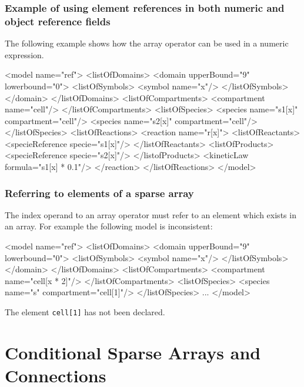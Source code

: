 \documentclass{cekarticle}
\begin{document}
\subsubsection{Example of using element references in both numeric and object reference fields}
The following example shows how the array operator can be used in
a numeric expression.

\begin{example}
<model name="ref">
    <listOfDomains>
        <domain upperBound="9" lowerbound="0">
            <listOfSymbols>
                <symbol name="x"/>
            </listOfSymbols>
        </domain>
    </listOfDomains>
    <listOfCompartments>
        <compartment name="cell"/>
    </listOfCompartments>
    <listOfSpecies>
        <species name="s1[x]" compartment="cell"/>
        <species name="s2[x]" compartment="cell"/>
    </listOfSpecies>
    <listOfReactions>
        <reaction name="r[x]">
            <listOfReactants>
                <specieReference specie="s1[x]"/>
            </listOfReactants>
            <listOfProducts>
                <specieReference specie="s2[x]"/>
            </listofProducts>
            <kineticLaw formula="s1[x] * 0.1"/>
        </reaction>
    </listOfReactions>
</model>
\end{example}

\subsubsection{Referring to elements of a sparse array}

The index operand to an array operator must refer to an element
which exists in an array.  For example the following model is
inconsistent:

\begin{example}
<model name="ref">
    <listOfDomains>
        <domain upperBound="9" lowerbound="0">
            <listOfSymbols>
                <symbol name="x"/>
            </listOfSymbols>
        </domain>
    </listOfDomains>
    <listOfCompartments>
        <compartment name="cell[x * 2]"/>
    </listOfCompartments>
    <listOfSpecies>
        <species name="s" compartment="cell[1]"/>
    </listOfSpecies>
    ...
</model>
\end{example}

The element \texttt{cell[1]} has not been declared.

\section{Conditional Sparse Arrays and Connections}
\end{document}
